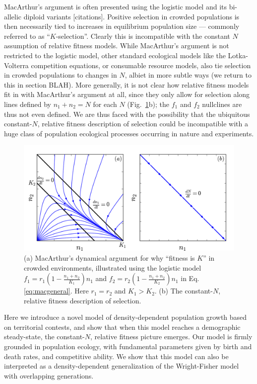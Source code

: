 \documentclass[11pt]{article}
\begin{document}
MacArthur's argument is often presented using the logistic model and its bi-allelic diploid variants [citations]. Positive selection in crowded populations is then necessarily tied to increases in equilibrium population size --- commonly referred to as ``$K$-selection''. Clearly this is  incompatible with the constant $N$ assumption of relative fitness models. While MacArthur's argument is not restricted to the logistic model, other standard ecological  models like the Lotka-Volterra competition equations, or consumable resource models, also tie selection in crowded populations to changes in $N$, albiet in more subtle ways (we return to this in section BLAH). More generally, it is not clear how relative fitness models fit in with MacArthur's argument at all, since they only allow for selection along lines defined by $n_1+n_2=N$ for each $N$ (Fig.~\ref{fig:Ksel}b); the $f_1$ and $f_2$ nullclines are thus not even defined. We are thus faced with the possibility that the ubiquitous constant-$N$, relative fitness description of selection could be incompatible with a huge class of population ecological processes occurring in nature and experiments. 

\begin{figure}
\centering
\includegraphics[scale=0.8]{Kplot.pdf}
\caption{\label{fig:Ksel} (a) MacArthur's dynamical argument for why ``fitness is $K$'' in crowded environments, illustrated using the logistic model $f_1=r_1(1-\frac{n_1+n_2}{K_1})n_1$ and $f_2=r_2(1-\frac{n_1+n_2}{K_2})n_1$ in Eq. \eqref{eq:macgeneral}. Here $r_1=r_2$ and $K_1>K_2$. (b) The constant-$N$, relative fitness description of selection.}
\end{figure}

Here we introduce a novel model of density-dependent population growth based on territorial contests, and show that when this model reaches a demographic steady-state, the constant-$N$, relative fitness picture emerges. Our model is firmly grounded in population ecology, with fundamental parameters given by birth and death rates, and competitive ability. We show that this model can also be interpreted as a density-dependent generalization of the Wright-Fisher model with overlapping generations. 
\end{document}
